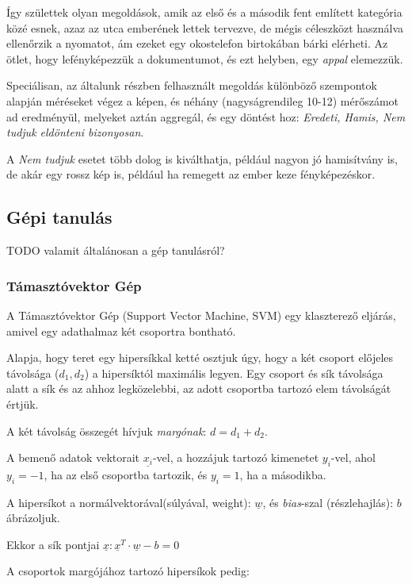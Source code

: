 Így születtek olyan megoldások, amik az első és a második fent említett kategória 
közé esnek, azaz az utca emberének lettek tervezve, de mégis céleszközt használva
ellenőrzik a nyomatot, ám ezeket egy okostelefon birtokában bárki elérheti.
Az ötlet, hogy lefényképezzük a dokumentumot, és ezt helyben, egy \textit{appal} elemezzük.


Speciálisan, az általunk részben felhasznált megoldás különböző szempontok alapján méréseket
végez a képen, és néhány (nagyságrendileg 10-12) mérőszámot ad eredményül, melyeket aztán
aggregál, és egy döntést hoz: \textit{Eredeti, Hamis, Nem tudjuk eldönteni bizonyosan}.

A \textit{Nem tudjuk} esetet több dolog is kiválthatja, például nagyon jó hamisítvány is,
de akár egy rossz kép is, például ha remegett az ember keze fényképezéskor.

\subsection{Gépi tanulás}

TODO valamit általánosan a gép tanulásról?

\subsubsection{Támasztóvektor Gép}

A Támasztóvektor Gép (Support Vector Machine, SVM) egy klaszterező eljárás, amivel egy adathalmaz két csoportra bontható. 

Alapja, hogy teret egy hipersíkkal ketté osztjuk úgy, hogy a két csoport előjeles távolsága ($ d_1, d_2 $) a hipersíktól maximális legyen. 
Egy csoport és sík távolsága alatt a sík és az ahhoz legközelebbi, az adott csoportba tartozó elem távolságát értjük. 


A két távolság összegét hívjuk \textit{margónak}: $ d = d_1 + d_2 $.

A bemenő adatok vektorait $ \underline{x_i} $-vel, a hozzájuk tartozó kimenetet
$ y_i $-vel, ahol $ y_i=-1 $, ha az első csoportba tartozik, és $ y_i=1 $, ha a másodikba.

A hipersíkot a normálvektorával(súlyával, weight): $ \underline{w} $, és \textit{bias}-szal 
(részlehajlás): $ b $ ábrázoljuk.


Ekkor a sík pontjai $ \underline{x}: \underline{x}^T \cdot \underline{w} - b = 0 $

A csoportok margójához tartozó hipersíkok pedig:

